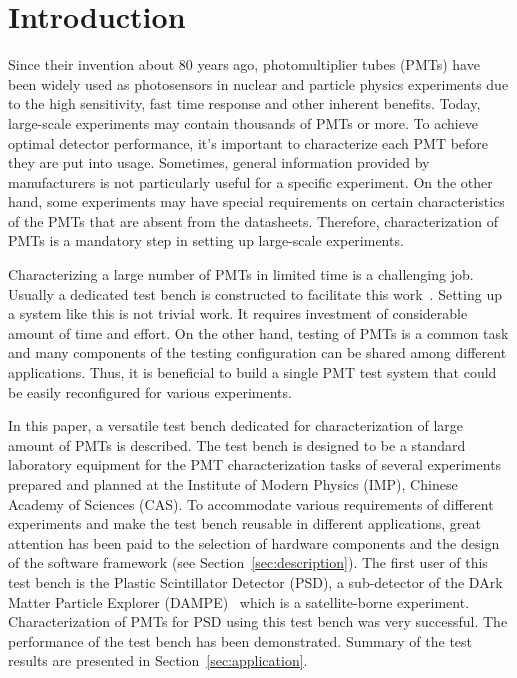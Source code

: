 \documentclass{nst}
\begin{document}

\maketitle


\section{Introduction}
\label{sec:introduction}

Since their invention about 80 years ago, photomultiplier tubes (PMTs) have been widely used as photosensors in nuclear and particle physics experiments due to the high sensitivity, fast time response and other inherent benefits. 
Today, large-scale experiments may contain thousands of PMTs or more. To achieve optimal detector performance, it's important to characterize each PMT before they are put into usage. 
Sometimes, general information provided by manufacturers is not particularly useful for a specific experiment.
On the other hand, some experiments may have special requirements on certain characteristics of the PMTs that are absent from the datasheets. 
Therefore, characterization of PMTs is a mandatory step in setting up large-scale experiments.

Characterizing a large number of PMTs in limited time is a challenging job. Usually a dedicated test bench is constructed to facilitate this work~\cite{barnhill_testing_2008,akgun_complete_2005,adragna_pmt-block_2006}.
Setting up a system like this is not trivial work. It requires investment of considerable amount of time and effort.
On the other hand, testing of PMTs is a common task and many components of the testing configuration can be shared among different applications.
Thus, it is beneficial to build a single PMT test system that could be easily reconfigured for various experiments.

In this paper, a versatile test bench dedicated for characterization of large amount of PMTs is described.
The test bench is designed to be a standard laboratory equipment for the PMT characterization tasks of several experiments prepared and planned at the Institute of Modern Physics (IMP), Chinese Academy of Sciences (CAS).
To accommodate various requirements of different experiments and make the test bench reusable in different applications, great attention has been paid to the selection of  hardware components and the design of the software framework (see Section~\ref{sec:description}).
The first user of this test bench is the Plastic Scintillator Detector (PSD), a sub-detector of the DArk Matter Particle Explorer (DAMPE)~\cite{Chang_Jin_dampe} which is a satellite-borne experiment. 
Characterization of PMTs for PSD using this test bench was very successful. The performance of the test bench has been demonstrated.
Summary of the test results are presented in Section~\ref{sec:application}.
\end{document}
